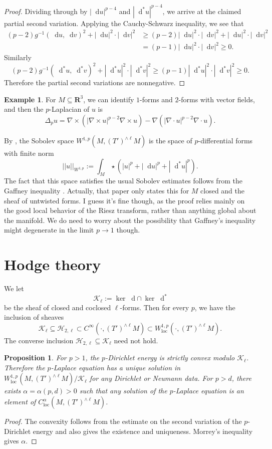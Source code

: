 \documentclass[reqno,10pt]{amsart}
\newcommand{\RR}{\mathbf{R}}
\newcommand*\dif{\mathop{}\!\mathrm{d}}
\newcommand{\loc}{\mathrm{loc}}
\newtheorem{proposition}[theorem]{Proposition}
\theoremstyle{definition}
\newtheorem{example}[theorem]{Example}
\numberwithin{equation}{section}
\begin{document}
\begin{proof}
Dividing through by $|\dif u|^{p - 4}$ and $|\dif^* u|^{p - 4}$, we arrive at the claimed partial second variation.
Applying the Cauchy-Schwarz inequality, we see that 
\begin{align*}
(p - 2) g^{-1}(\dif u, \dif v)^2 + |\dif u|^2 \cdot |\dif v|^2 &\geq (p - 2) |\dif u|^2 \cdot |\dif v|^2 + |\dif u|^2 \cdot |\dif v|^2 \\
&= (p - 1) |\dif u|^2 \cdot |\dif v|^2 \geq 0.
\end{align*}
Similarly
$$(p - 2) g^{-1}(\dif^* u, \dif^* v)^2 + |\dif^* u|^2 \cdot |\dif^* v|^2 \geq (p - 1) |\dif^* u|^2 \cdot |\dif^* v|^2 \geq 0.$$
Therefore the partial second variations are nonnegative.
\end{proof}

\begin{example}
For $M \subseteq \RR^3$, we can identify $1$-forms and $2$-forms with vector fields, and then the $p$-Laplacian of $u$ is 
$$\Delta_p u = \nabla \times (|\nabla \times u|^{p - 2} \nabla \times u) - \nabla(|\nabla \cdot u|^{p - 2} \nabla \cdot u).$$
\end{example}

By \cite[\S3]{Scott95}, the Sobolev space $W^{1, p}(M, (T')^{\wedge \ell} M)$ is the space of $p$-differential forms with finite norm 
$$||u||_{W^{1, p}} := \int_M \star(|u|^p + |\dif u|^p + |\dif^* u|^p).$$
The fact that this space satisfies the usual Sobolev estimates follows from the Gaffney inequality \cite[Proposition 4.3]{Scott95}.
Actually, that paper only states this for $M$ closed and the sheaf of untwisted forms.
I guess it's fine though, as the proof relies mainly on the good local behavior of the Riesz transform, rather than anything global about the manifold.
We do need to worry about the possibility that Gaffney's inequality might degenerate in the limit $p \to 1$ though.

\section{Hodge theory}
We let
$$\mathscr K_\ell := \ker \dif \cap \ker \dif^*$$
be the sheaf of closed and coclosed $\ell$-forms.
Then for every $p$, we have the inclusion of sheaves
$$\mathscr K_\ell \subseteq \mathscr H_{2, \ell} \subset C^\infty(\cdot, (T')^{\wedge \ell} M) \subset W^{1, p}_\loc(\cdot, (T')^{\wedge \ell} M).$$
The converse inclusion $\mathscr H_{2, \ell} \subseteq \mathscr K_\ell$ need not hold.

\begin{proposition}
For $p > 1$, the $p$-Dirichlet energy is strictly convex modulo $\mathscr K_\ell$.
Therefore the $p$-Laplace equation has a unique solution in $W^{1, p}_\loc(M, (T')^{\wedge \ell} M)/\mathscr K_\ell$ for any Dirichlet or Neumann data.
For $p > d$, there exists $\alpha = \alpha(p, d) > 0$ such that any solution of the $p$-Laplace equation is an element of $C^\alpha_\loc(M, (T')^{\wedge \ell} M)$.
\end{proposition}
\begin{proof}
The convexity follows from the estimate on the second variation of the $p$-Dirichlet energy and also gives the existence and uniqueness.
Morrey's inequality gives $\alpha$.
\end{proof}
\end{document}
